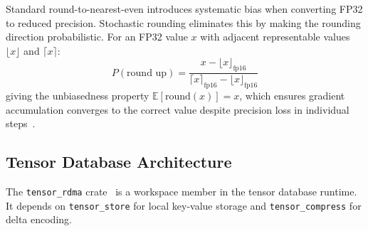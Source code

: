 \documentclass[11pt,letterpaper]{article}
\theoremstyle{definition}
\begin{document}
Standard round-to-nearest-even introduces systematic bias when converting FP32 to reduced precision. Stochastic rounding eliminates this by making the rounding direction probabilistic. For an FP32 value $x$ with adjacent representable values $\lfloor x \rfloor$ and $\lceil x \rceil$:
\begin{equation}
    P(\text{round up}) = \frac{x - \lfloor x \rfloor_{\text{fp16}}}{\lceil x \rceil_{\text{fp16}} - \lfloor x \rfloor_{\text{fp16}}}
\end{equation}
giving the unbiasedness property $\mathbb{E}[\text{round}(x)] = x$, which ensures gradient accumulation converges to the correct value despite precision loss in individual steps~\cite{micikevicius2018mixed}.

\subsection{Tensor Database Architecture}
\label{sec:database-architecture}

The \texttt{tensor\_rdma} crate~\cite{scuffedrdma-repo} is a workspace member in the tensor database runtime. It depends on \texttt{tensor\_store} for local key-value storage and \texttt{tensor\_compress} for delta encoding.
\end{document}
